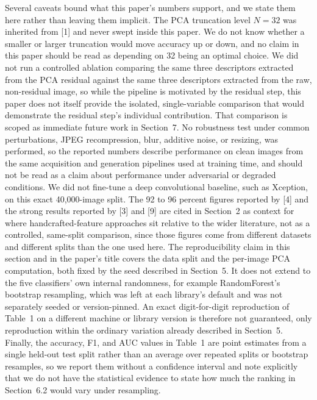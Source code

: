 \documentclass[11pt]{article}
\begin{document}
Several caveats bound what this paper's numbers support, and we state them here rather than leaving them implicit. The PCA truncation level $N=32$ was inherited from [1] and never swept inside this paper. We do not know whether a smaller or larger truncation would move accuracy up or down, and no claim in this paper should be read as depending on 32 being an optimal choice. We did not run a controlled ablation comparing the same three descriptors extracted from the PCA residual against the same three descriptors extracted from the raw, non-residual image, so while the pipeline is motivated by the residual step, this paper does not itself provide the isolated, single-variable comparison that would demonstrate the residual step's individual contribution. That comparison is scoped as immediate future work in Section~7. No robustness test under common perturbations, JPEG recompression, blur, additive noise, or resizing, was performed, so the reported numbers describe performance on clean images from the same acquisition and generation pipelines used at training time, and should not be read as a claim about performance under adversarial or degraded conditions. We did not fine-tune a deep convolutional baseline, such as Xception, on this exact 40,000-image split. The 92 to 96 percent figures reported by [4] and the strong results reported by [3] and [9] are cited in Section~2 as context for where handcrafted-feature approaches sit relative to the wider literature, not as a controlled, same-split comparison, since those figures come from different datasets and different splits than the one used here. The reproducibility claim in this section and in the paper's title covers the data split and the per-image PCA computation, both fixed by the seed described in Section~5. It does not extend to the five classifiers' own internal randomness, for example RandomForest's bootstrap resampling, which was left at each library's default and was not separately seeded or version-pinned. An exact digit-for-digit reproduction of Table~1 on a different machine or library version is therefore not guaranteed, only reproduction within the ordinary variation already described in Section~5. Finally, the accuracy, F1, and AUC values in Table~1 are point estimates from a single held-out test split rather than an average over repeated splits or bootstrap resamples, so we report them without a confidence interval and note explicitly that we do not have the statistical evidence to state how much the ranking in Section~6.2 would vary under resampling.
\end{document}
